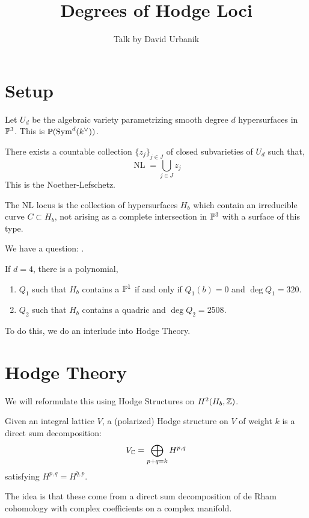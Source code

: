 \documentclass[12pt]{amsart}
\begin{document}
\title{Degrees of Hodge Loci}

\author{Talk by David Urbanik}
\maketitle

\section{Setup}
Let $U_d$ be the algebraic variety parametrizing smooth degree $d$ hypersurfaces in $\P^3$. This is $\P(\Sym^d(k^\vee))$. 

\begin{theorem}[Lefschetz]
    There exists a countable collection $\{z_j\}_{j \in J}$ of closed subvarieties of $U_d$ such that, 
    \[ \operatorname{NL} = \bigcup_{j \in J} z_j\]
    This is the Noether-Lefschetz. 
\end{theorem}

The NL locus is the collection of hypersurfaces $H_b$ which contain an irreducible curve $C \subset H_b$, not arising as a complete intersection in $\P^3$ with a surface of this type. 

We have a question: . 

If $d = 4$, there is a polynomial, 
\begin{enumerate}
    \item $Q_1$ such that $H_b$ contains a $\P^1$ if and only if $Q_1(b) = 0$ and $\deg Q_1 = 320$. 
    \item $Q_2$ such that $H_b$ contains a quadric and $\deg Q_2 = 2508$. 
\end{enumerate}

To do this, we do an interlude into Hodge Theory. 

\section{Hodge Theory}
We will reformulate this using Hodge Structures on $H^2(H_b, \Z)$. 

\begin{definition}
    Given an integral lattice $V$, a (polarized) Hodge structure on $V$ of weight $k$ is a direct sum decomposition: 
    \[ V_\C = \bigoplus_{p+q = k} H^{p,q}\]
    satisfying $H^{p,q} = \overline{H^{q,p}}$. 
\end{definition}

The idea is that these come from a direct sum decomposition of de Rham cohomology with complex coefficients on a complex manifold. 
\end{document}
